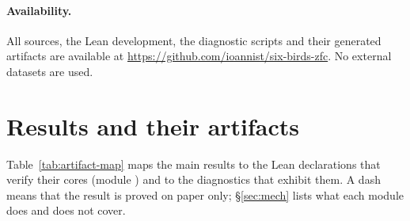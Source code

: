 \documentclass[11pt]{article}
\theoremstyle{definition}
\begin{document}
\paragraph{Availability.} All sources, the Lean development, the diagnostic scripts and their
generated artifacts are available at \url{https://github.com/ioannist/six-birds-zfc}. No external
datasets are used.
 \section{Results and their artifacts}\label{app:artifact-map}

Table~\ref{tab:artifact-map} maps the main results to the Lean declarations that verify their
cores (module ) and to the diagnostics that exhibit them. A
dash means that the result is proved on paper only; \S\ref{sec:mech} lists what each module does
and does not cover.
\end{document}
